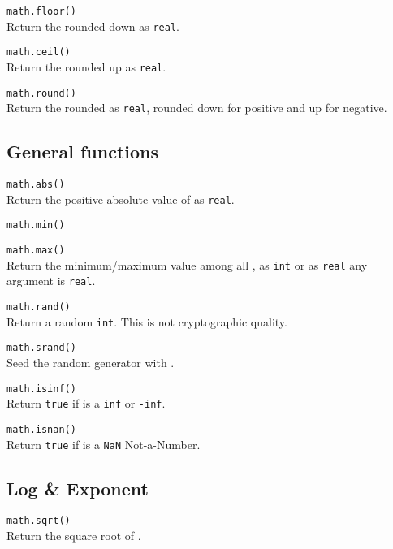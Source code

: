 \hangpar \texttt{math.floor(}\texttt{)} \\
Return the rounded down  as \texttt{real}.

\hangpar \texttt{math.ceil(}\texttt{)} \\
Return the rounded up  as \texttt{real}.

\hangpar \texttt{math.round(}\texttt{)} \\
Return the rounded  as \texttt{real}, rounded down for positive and up for negative.

\subsection*{General functions}

\hangpar \texttt{math.abs(}\texttt{)} \\
Return the positive absolute value of  as \texttt{real}.

\hangpar \texttt{math.min(}\textib{[values]*}\texttt{)}

\hangpar \texttt{math.max(}\textib{[values]*}\texttt{)} \\
Return the minimum/maximum value among all , as \texttt{int} or as \texttt{real} any argument is \texttt{real}.

\hangpar \texttt{math.rand()} \\
Return a random \texttt{int}. This is not cryptographic quality.

\hangpar \texttt{math.srand(}\texttt{)} \\
Seed the random generator with .

\hangpar \texttt{math.isinf(}\texttt{)} \\
Return \texttt{true} if  is a \texttt{inf} or \texttt{-inf}.

\hangpar \texttt{math.isnan(}\texttt{)} \\
Return \texttt{true} if  is a \texttt{NaN} Not-a-Number.

\subsection*{Log \& Exponent}

\hangpar \texttt{math.sqrt(}\texttt{)}\\
Return the square root of .


